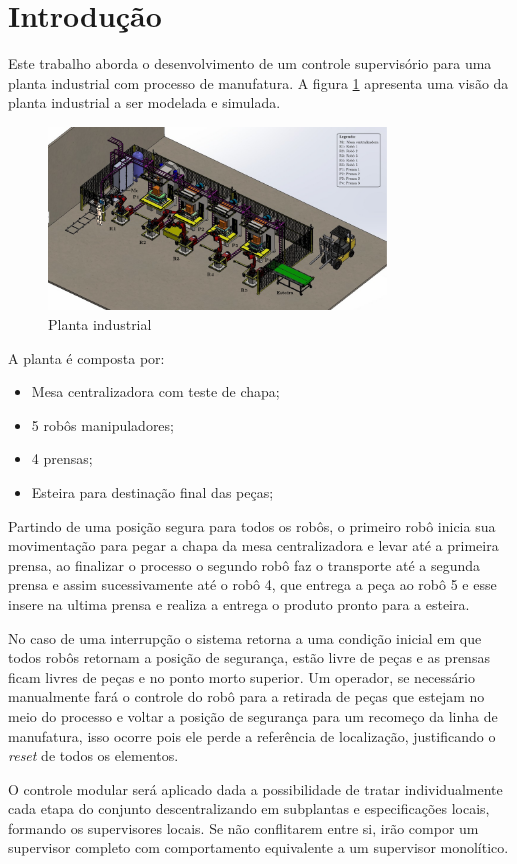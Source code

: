 \section{Introdução}

Este trabalho aborda o desenvolvimento de um controle supervisório para uma planta industrial com processo de  manufatura. A figura \ref{fig:processo} apresenta uma visão da planta industrial a ser modelada e simulada.


\begin{figure}[H]%
	\centering
	\includegraphics[width=0.8\textwidth]{imagens/processo.eps}
	\caption{Planta industrial}\label{fig:processo}
\end{figure}

A planta é composta por:
\begin{itemize}
    \item Mesa centralizadora com teste de chapa;
    \item 5 robôs manipuladores;
    \item 4 prensas;
    \item Esteira para destinação final das peças;
\end{itemize}

Partindo de uma posição segura para todos os robôs, o primeiro robô inicia sua movimentação para pegar a chapa da mesa centralizadora e levar até a primeira prensa, ao finalizar o processo o segundo robô faz o transporte até a segunda prensa e assim sucessivamente até o robô 4, que entrega a peça ao robô 5 e esse insere na ultima prensa e realiza a entrega o produto pronto para a esteira. 

No caso de uma interrupção o sistema retorna a uma condição inicial em que todos robôs retornam a posição de segurança, estão livre de peças e as prensas ficam livres de peças e no ponto morto superior. Um operador, se necessário manualmente fará o controle do robô para a retirada de peças que estejam no meio do processo e voltar a posição de segurança para um recomeço da linha de manufatura, isso ocorre pois ele perde a referência de localização, justificando o \textit{reset} de todos os elementos.

O controle modular será aplicado dada a possibilidade de tratar individualmente cada etapa do conjunto descentralizando em subplantas e especificações locais, formando os supervisores locais. Se não conflitarem entre si, irão compor um supervisor completo com comportamento equivalente a um supervisor monolítico.